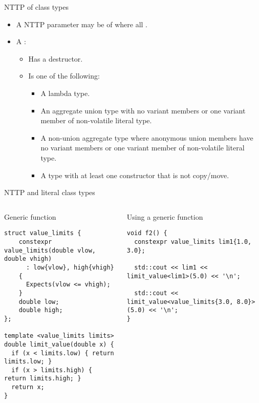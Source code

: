 \begin{frame}[t,fragile]{NTTP of class types}
\begin{itemize}
  \item A NTTP parameter may be of  where all .
  
  \item A :
    \begin{itemize}
      \item Has a  destructor.
      \item Is one of the following:
        \begin{itemize}
          \item A lambda type.
          \item An aggregate union type with 
                no variant members or one variant member of non-volatile literal type.
          \item A non-union aggregate type where anonymous union members have
                no variant members or one variant member of non-volatile literal type.
          \item A type with at least one  constructor that is not copy/move.
        \end{itemize}
    \end{itemize}
\end{itemize}
\end{frame}

\begin{frame}[t,fragile]{NTTP and literal class types}
\begin{columns}[T]

\begin{block}{Generic function}
\begin{lstlisting}
struct value_limits {
    constexpr value_limits(double vlow, double vhigh)
      : low{vlow}, high{vhigh} 
    {
      Expects(vlow <= vhigh);
    }
    double low;
    double high;
};

template <value_limits limits>
double limit_value(double x) {
  if (x < limits.low) { return limits.low; }
  if (x > limits.high) { return limits.high; }
  return x;
}
\end{lstlisting}
\end{block}

\begin{block}{Using a generic function}
\begin{lstlisting}[basicstyle=\tiny]
void f2() {
  constexpr value_limits lim1{1.0, 3.0};
  
  std::cout << lim1 << limit_value<lim1>(5.0) << '\n';

  std::cout << limit_value<value_limits{3.0, 8.0}>(5.0) << '\n';
}
\end{lstlisting}
\end{block}

\end{columns}
\end{frame}
